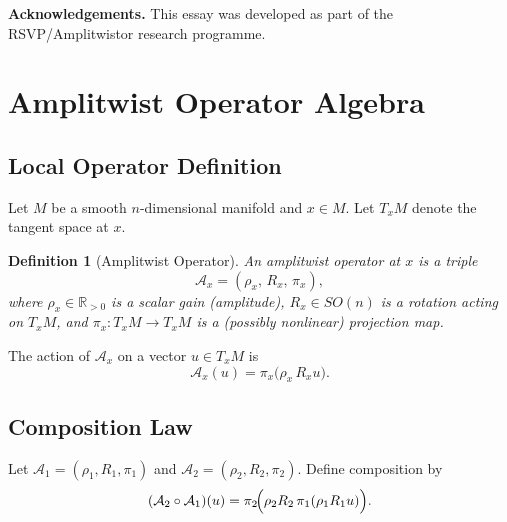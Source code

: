 \documentclass[12pt, a4paper]{article}
\newtheorem{definition}[theorem]{Definition}
\theoremstyle{remark}
\theoremstyle{definition}
\begin{document}
\bigskip
\noindent\textbf{Acknowledgements.}\quad
This essay was developed as part of the RSVP\slash Amplitwistor research programme.

\clearpage
\appendix


\section{Amplitwist Operator Algebra}
\label{app:algebra}

\subsection{Local Operator Definition}

Let $M$ be a smooth $n$-dimensional manifold and $x \in M$.  Let $T_x M$ denote the tangent
space at $x$.

\begin{definition}[Amplitwist Operator]
An \emph{amplitwist operator} at $x$ is a triple
\[
\mathcal{A}_x = (\rho_x,\, R_x,\, \pi_x),
\]
where $\rho_x \in \mathbb{R}_{>0}$ is a scalar gain (amplitude), $R_x \in SO(n)$ is a
rotation acting on $T_x M$, and $\pi_x \colon T_x M \to T_x M$ is a (possibly nonlinear)
projection map.
\end{definition}

The action of $\mathcal{A}_x$ on a vector $u \in T_x M$ is
\[
\mathcal{A}_x(u) = \pi_x\!\bigl(\rho_x\, R_x u\bigr).
\]

\subsection{Composition Law}

Let $\mathcal{A}_1 = (\rho_1, R_1, \pi_1)$ and $\mathcal{A}_2 = (\rho_2, R_2, \pi_2)$.
Define composition by
\[
(\mathcal{A}_2 \circ \mathcal{A}_1)(u)
= \pi_2\!\Bigl(\rho_2 R_2\,\pi_1(\rho_1 R_1 u)\Bigr).
\]
\end{document}
